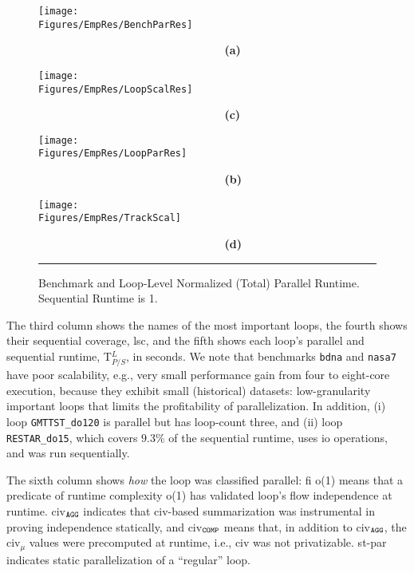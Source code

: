 \documentclass{sig-alternate}
\newcommand{\Figures}[1]{../Figures/}
\begin{document}
\begin{figure*}[t]
\begin{minipage}{1.2\columnwidth}
    \texttt{[image: \\Figures/EmpRes/BenchParRes]} 

      {\bf~~~~~~~~~~~~~~~~~~~~~~~~~~~~~(a)} \vspace{2ex}

    \texttt{[image: \\Figures/EmpRes/LoopScalRes]}
      
      {\bf~~~~~~~~~~~~~~~~~~~~~~~~~~~~~(c)}\vspace{1ex}

\end{minipage}
\begin{minipage}{0.9\columnwidth}
    \texttt{[image: \\Figures/EmpRes/LoopParRes]} 

      {\bf~~~~~~~~~~~~~~~~~~~~~~~~~~~~~(b)}\vspace{2ex}

   \texttt{[image: \\Figures/EmpRes/TrackScal]}
      
      {\bf~~~~~~~~~~~~~~~~~~~~~~~~~~~~~(d)}\vspace{1ex}

\end{minipage}
\hrule
\caption{ Benchmark and Loop-Level Normalized (Total) Parallel Runtime. Sequential Runtime is 1.}
\label{fig:ParRuntime} %
\end{figure*}


The third column shows the names of the most important loops,
the fourth shows their sequential coverage, {\sc lsc}, and the
fifth shows each loop's parallel and sequential runtime, T$_{P/S}^L$, in seconds.
%
We note that benchmarks {\tt bdna} and {\tt nasa7} have poor scalability, e.g., very small
performance gain from four to eight-core execution, because they exhibit
small (historical) datasets: low-granularity important loops that limits the 
profitability of parallelization.
In addition, (i) loop {\tt GMTTST\_do120} 
is parallel but has loop-count three, and (ii) loop {\tt RESTAR\_do15},
which covers $9.3\%$ of the sequential runtime, uses {\sc io} operations,
and was run sequentially. 

The sixth column shows {\em how} the loop was classified parallel: {\sc fi} {\sc o(1)}
means that a predicate of runtime complexity {\sc o(1)} has validated loop's flow
independence at runtime. {\sc civ}$_{\tt{}AGG}$ indicates that {\sc civ}-based summarization 
was instrumental in proving independence statically, and {\sc civ}$_{\tt{}COMP}$ means that,
in addition to {\sc civ}$_{\tt{}AGG}$, the {\sc civ}$_\mu$ values were precomputed
at runtime, i.e., {\sc civ} was not privatizable.  {\sc st-par} indicates static
parallelization of a ``regular'' loop. 
\end{document}
